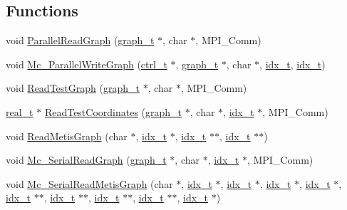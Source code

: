 \subsection*{Functions}
\begin{DoxyCompactItemize}
\item 
void \hyperlink{a00954_a9229078a0340ad298a71750c0ad43353}{Parallel\+Read\+Graph} (\hyperlink{a00734}{graph\+\_\+t} $\ast$, char $\ast$, M\+P\+I\+\_\+\+Comm)
\item 
void \hyperlink{a00954_a7ced85ce3eee74389db1e96de523bb13}{Mc\+\_\+\+Parallel\+Write\+Graph} (\hyperlink{a00742}{ctrl\+\_\+t} $\ast$, \hyperlink{a00734}{graph\+\_\+t} $\ast$, char $\ast$, \hyperlink{a00876_aaa5262be3e700770163401acb0150f52}{idx\+\_\+t}, \hyperlink{a00876_aaa5262be3e700770163401acb0150f52}{idx\+\_\+t})
\item 
void \hyperlink{a00954_ad576773d5c2e0a0662e8913264b980b1}{Read\+Test\+Graph} (\hyperlink{a00734}{graph\+\_\+t} $\ast$, char $\ast$, M\+P\+I\+\_\+\+Comm)
\item 
\hyperlink{a00876_a1924a4f6907cc3833213aba1f07fcbe9}{real\+\_\+t} $\ast$ \hyperlink{a00954_a612a9ac7e28ee021871b62eec92bed0b}{Read\+Test\+Coordinates} (\hyperlink{a00734}{graph\+\_\+t} $\ast$, char $\ast$, \hyperlink{a00876_aaa5262be3e700770163401acb0150f52}{idx\+\_\+t} $\ast$, M\+P\+I\+\_\+\+Comm)
\item 
void \hyperlink{a00954_a779688e907e334b05cb76755bce1ae74}{Read\+Metis\+Graph} (char $\ast$, \hyperlink{a00876_aaa5262be3e700770163401acb0150f52}{idx\+\_\+t} $\ast$, \hyperlink{a00876_aaa5262be3e700770163401acb0150f52}{idx\+\_\+t} $\ast$$\ast$, \hyperlink{a00876_aaa5262be3e700770163401acb0150f52}{idx\+\_\+t} $\ast$$\ast$)
\item 
void \hyperlink{a00954_a8c060a2a87973834a7cda156ae5e833e}{Mc\+\_\+\+Serial\+Read\+Graph} (\hyperlink{a00734}{graph\+\_\+t} $\ast$, char $\ast$, \hyperlink{a00876_aaa5262be3e700770163401acb0150f52}{idx\+\_\+t} $\ast$, M\+P\+I\+\_\+\+Comm)
\item 
void \hyperlink{a00954_a6228d68f75df6d736a0748c1cab40862}{Mc\+\_\+\+Serial\+Read\+Metis\+Graph} (char $\ast$, \hyperlink{a00876_aaa5262be3e700770163401acb0150f52}{idx\+\_\+t} $\ast$, \hyperlink{a00876_aaa5262be3e700770163401acb0150f52}{idx\+\_\+t} $\ast$, \hyperlink{a00876_aaa5262be3e700770163401acb0150f52}{idx\+\_\+t} $\ast$, \hyperlink{a00876_aaa5262be3e700770163401acb0150f52}{idx\+\_\+t} $\ast$, \hyperlink{a00876_aaa5262be3e700770163401acb0150f52}{idx\+\_\+t} $\ast$$\ast$, \hyperlink{a00876_aaa5262be3e700770163401acb0150f52}{idx\+\_\+t} $\ast$$\ast$, \hyperlink{a00876_aaa5262be3e700770163401acb0150f52}{idx\+\_\+t} $\ast$$\ast$, \hyperlink{a00876_aaa5262be3e700770163401acb0150f52}{idx\+\_\+t} $\ast$$\ast$, \hyperlink{a00876_aaa5262be3e700770163401acb0150f52}{idx\+\_\+t} $\ast$)

\end{DoxyCompactItemize}
